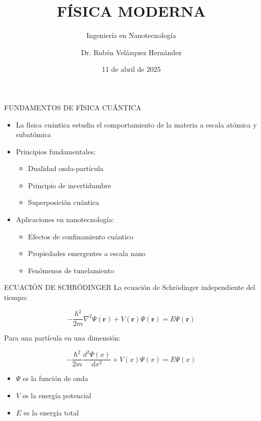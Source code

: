 \documentclass[aspectratio=169]{beamer} %
\title{\textbf{FÍSICA MODERNA}}
\subtitle{Ingeniería en Nanotecnología}
\author{Dr. Rubén Velázquez Hernández}
\date{11 de abril de 2025}
\institute{Universidad Tecnológica de Querétaro}
\begin{document}
	
	\begin{frame}
		\titlepage
	\end{frame}
	
	\begin{frame}{FUNDAMENTOS DE FÍSICA CUÁNTICA}
		\begin{itemize}
			\item La física cuántica estudia el comportamiento de la materia a escala atómica y subatómica
			\item Principios fundamentales:
			\begin{itemize}
				\item Dualidad onda-partícula
				\item Principio de incertidumbre
				\item Superposición cuántica
			\end{itemize}
			\item Aplicaciones en nanotecnología:
			\begin{itemize}
				\item Efectos de confinamiento cuántico
				\item Propiedades emergentes a escala nano
				\item Fenómenos de tunelamiento
			\end{itemize}
		\end{itemize}
	\end{frame}
	
	\begin{frame}{ECUACIÓN DE SCHRÖDINGER}
		La ecuación de Schrödinger independiente del tiempo:
		
		\begin{equation}
			-\frac{\hbar^2}{2m}\nabla^2\Psi(\mathbf{r}) + V(\mathbf{r})\Psi(\mathbf{r}) = E\Psi(\mathbf{r})
		\end{equation}
		
		Para una partícula en una dimensión:
		
		\begin{equation}
			-\frac{\hbar^2}{2m}\frac{d^2\Psi(x)}{dx^2} + V(x)\Psi(x) = E\Psi(x)
		\end{equation}
		
		\begin{itemize}
			\item $\Psi$ es la función de onda
			\item $V$ es la energía potencial
			\item $E$ es la energía total
		\end{itemize}
	\end{frame}
	
\end{document}
